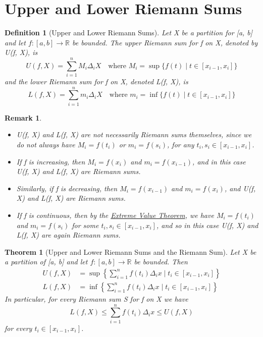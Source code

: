\documentclass[11pt, oneside]{book}
\theoremstyle{break}
\newtheorem{thm}{Theorem}[section]
\newtheorem*{remark}{Remark}
\newtheorem{defn}{Definition}[section]
\newcommand{\bb}[1]{\mathbb{#1}}		%
\begin{document}
\section{Upper and Lower Riemann Sums}

\begin{defn}[Upper and Lower Riemann Sums]
	Let X be a partition for [a, b] and let $f: [a, b] \to \bb{R}$ be bounded. The upper Riemann sum for f on X, denoted by U(f, X), is
	\[
		U(f, X) = \sum_{i=1}^{n} M_i \Delta_i X \quad \text{where } M_i = \sup \{f(t) \; | \; t \in [x_{i-1}, x_i] \}
	\]
	and the lower Riemann sum for f on X, denoted L(f, X), is
	\[
		L(f, X) = \sum_{i = 1}^{n} m_i \Delta_i X \quad \text{where } m_i = \inf \{f(t) \; | \; t \in [x_{i-1}, x_i]\}
	\]
\end{defn}

\begin{remark}
	\begin{itemize}
		\item U(f, X) and L(f, X) are not necessarily Riemann sums themselves, since we do not always have $M_i = f(t_i)$ or $m_i = f(s_i)$, for any $t_i, s_i \in [x_{i-1}, x_i]$.
		\item If f is increasing, then $M_i = f(x_i)$ and $m_i = f(x_{i-1})$, and in this case U(f, X) and L(f, X) are Riemann sums.
		\item Similarly, if f is decreasing, then $M_i = f(x_{i-1})$ and $m_i = f(x_i)$, and U(f, X) and L(f, X) are Riemann sums.
		\item If f is continuous, then by the \hyperref[EVT]{Extreme Value Theorem}, we have $M_i = f(t_i)$ and $m_i = f(s_i)$ for some $t_i, s_i \in [x_{i-1}, x_i]$, and so in this case U(f, X) and L(f, X) are again Riemann sums.
	\end{itemize}
\end{remark}

\begin{thm}[Upper and Lower Riemann Sums and the Riemann Sum]
	Let X be a partition of [a, b] and let $f: [a, b] \to \bb{R}$ be bounded. Then
	\begin{align*}
		U(f, X) &= \sup \left\{\sum_{i=1}^{n} f(t_i) \Delta_i x \; \Bigg| \; t_i \in [x_{i-1}, x_i] \right\} \\
		L(f, X) &= \inf \left\{\sum_{i=1}^{n} f(t_i) \Delta_i x \; \Bigg| \; t_i \in [x_{i-1}, x_i] \right\}
	\end{align*}
	In particular, for every Riemann sum S for f on X we have
	\[
		L(f, X) \leq \sum_{i=1}^{n} f(t_i) \Delta_i x \leq U(f, X)
	\]
	for every $t_i \in [x_{i-1}, x_i]$.
\end{thm}
\end{document}
